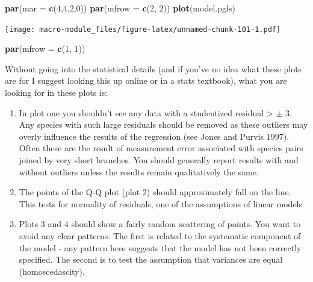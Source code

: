 \documentclass[]{book}
\newenvironment{Shaded}{\begin{snugshade}}{\end{snugshade}}
\newcommand{\KeywordTok}[1]{\textcolor[rgb]{0.13,0.29,0.53}{\textbf{{#1}}}}
\newcommand{\DataTypeTok}[1]{\textcolor[rgb]{0.13,0.29,0.53}{{#1}}}
\newcommand{\DecValTok}[1]{\textcolor[rgb]{0.00,0.00,0.81}{{#1}}}
\newcommand{\NormalTok}[1]{{#1}}
\providecommand{\tightlist}{%
  \setlength{\itemsep}{0pt}\setlength{\parskip}{0pt}}
\theoremstyle{definition}
\theoremstyle{definition}
\theoremstyle{definition}
\theoremstyle{remark}
\begin{document}
\begin{Shaded}
\begin{Highlighting}[]
\KeywordTok{par}\NormalTok{(}\DataTypeTok{mar =} \KeywordTok{c}\NormalTok{(}\DecValTok{4}\NormalTok{,}\DecValTok{4}\NormalTok{,}\DecValTok{2}\NormalTok{,}\DecValTok{0}\NormalTok{))}
\KeywordTok{par}\NormalTok{(}\DataTypeTok{mfrow =} \KeywordTok{c}\NormalTok{(}\DecValTok{2}\NormalTok{, }\DecValTok{2}\NormalTok{))}
\KeywordTok{plot}\NormalTok{(model.pgls)}
\end{Highlighting}
\end{Shaded}

\texttt{[image: macro-module\_files/figure-latex/unnamed-chunk-101-1.pdf]}

\begin{Shaded}
\begin{Highlighting}[]
\KeywordTok{par}\NormalTok{(}\DataTypeTok{mfrow =} \KeywordTok{c}\NormalTok{(}\DecValTok{1}\NormalTok{, }\DecValTok{1}\NormalTok{))}
\end{Highlighting}
\end{Shaded}

Without going into the statistical details (and if you've no idea what
these plots are for I suggest looking this up online or in a stats
textbook), what you are looking for in these plots is:

\begin{enumerate}
\def\labelenumi{\arabic{enumi}.}
\tightlist
\item
  In plot one you shouldn't see any data with a studentized residual
  \textgreater{} \(\pm\) 3. Any species with such large residuals should
  be removed as these outliers may overly influence the results of the
  regression (see Jones and Purvis 1997). Often these are the result of
  measurement error associated with species pairs joined by very short
  branches. You should generally report results with and without
  outliers unless the results remain qualitatively the same.
\item
  The points of the Q-Q plot (plot 2) should approximately fall on the
  line. This tests for normality of residuals, one of the assumptions of
  linear models
\item
  Plots 3 and 4 should show a fairly random scattering of points. You
  want to avoid any clear patterns. The first is related to the
  systematic component of the model - any pattern here suggests that the
  model has not been correctly specified. The second is to test the
  assumption that variances are equal (homoscedascity).
\end{enumerate}
\end{document}
